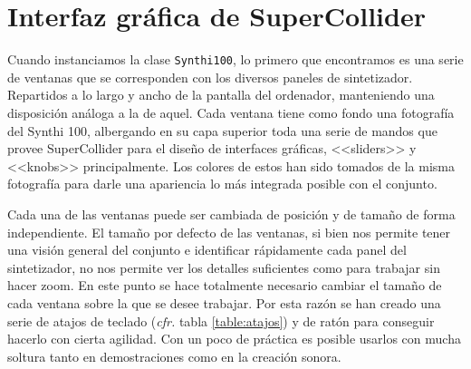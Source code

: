 \section{Interfaz gráfica de SuperCollider}
Cuando instanciamos la clase \texttt{Synthi100}, lo primero que encontramos es una serie de ventanas que se corresponden con los diversos paneles de sintetizador. Repartidos a lo largo y ancho de la pantalla del ordenador, manteniendo una disposición análoga a la de aquel. Cada ventana tiene como fondo una fotografía del Synthi 100, albergando en su capa superior toda una serie de mandos que provee SuperCollider para el diseño de interfaces gráficas, <<sliders>> y <<knobs>> principalmente. Los colores de estos han sido tomados de la misma fotografía para darle una apariencia lo más integrada posible con el conjunto. 
	
Cada una de las ventanas puede ser cambiada de posición y de tamaño de forma independiente. El tamaño por defecto de las ventanas, si bien nos permite tener una visión general del conjunto e identificar rápidamente cada panel del sintetizador, no nos permite ver los detalles suficientes como para trabajar sin hacer zoom. En este punto se hace totalmente necesario cambiar el tamaño de cada ventana sobre la que se desee trabajar. Por esta razón se han creado una serie de atajos de teclado (\textit{cfr.} tabla \ref{table:atajos})  y de ratón para conseguir hacerlo con cierta agilidad. Con un poco de práctica es posible usarlos con mucha soltura tanto en demostraciones como en la creación sonora.
	

